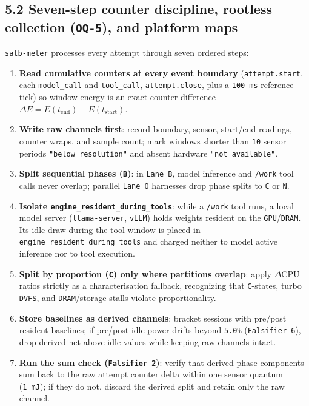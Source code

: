\documentclass[10pt,letterpaper]{article}
\providecommand{\tightlist}{\setlength{\itemsep}{1pt}\setlength{\parskip}{0pt}}
\begin{document}
\subsection{\texorpdfstring{5.2 Seven-step counter discipline, rootless
collection (\texttt{OQ-5}), and platform
maps}{5.2 Seven-step counter discipline, rootless collection (OQ-5), and platform maps}}\label{seven-step-counter-discipline-rootless-collection-oq-5-and-platform-maps}

\texttt{satb-\allowbreak{}meter} processes every attempt through seven ordered steps:

\begin{enumerate}
\def\labelenumi{\arabic{enumi}.}
\tightlist
\item
  \textbf{Read cumulative counters at every event boundary}
  (\texttt{attempt.\allowbreak{}start}, each \texttt{model\_\allowbreak{}call} and
  \texttt{tool\_\allowbreak{}call}, \texttt{attempt.\allowbreak{}close}, plus a \texttt{100\ ms}
  reference tick) so window energy is an exact counter difference
  \(\Delta E = E(t_{\text{end}}) - E(t_{\text{start}})\).
\item
  \textbf{Write raw channels first}: record boundary, sensor, start/end
  readings, counter wraps, and sample count; mark windows shorter than
  \texttt{10} sensor periods \texttt{"below\_\allowbreak{}resolution"} and absent
  hardware \texttt{"not\_\allowbreak{}available"}.
\item
  \textbf{Split sequential phases (\texttt{B})}: in \texttt{Lane\ B},
  model inference and \texttt{/work} tool calls never overlap; parallel
  \texttt{Lane\ O} harnesses drop phase splits to \texttt{C} or
  \texttt{N}.
\item
  \textbf{Isolate \texttt{engine\_\allowbreak{}resident\_\allowbreak{}during\_\allowbreak{}tools}}: while a
  \texttt{/work} tool runs, a local model server (\texttt{llama-\allowbreak{}server},
  \texttt{vLLM}) holds weights resident on the
  \texttt{GPU}/\allowbreak{}\texttt{DRAM}. Its idle draw during the tool window is
  placed in \texttt{engine\_\allowbreak{}resident\_\allowbreak{}during\_\allowbreak{}tools} and charged neither
  to model active inference nor to tool execution.
\item
  \textbf{Split by proportion (\texttt{C}) only where partitions
  overlap}: apply \(\Delta \text{CPU}\) ratios strictly as a
  characterisation fallback, recognizing that \texttt{C}-states, turbo
  \texttt{DVFS}, and \texttt{DRAM}/\allowbreak{}storage stalls violate
  proportionality.
\item
  \textbf{Store baselines as derived channels}: bracket sessions with
  pre/post resident baselines; if pre/post idle power drifts beyond
  \texttt{5.0\%} (\texttt{Falsifier\ 6}), drop derived net-above-idle
  values while keeping raw channels intact.
\item
  \textbf{Run the sum check (\texttt{Falsifier\ 2})}: verify that
  derived phase components sum back to the raw attempt counter delta
  within one sensor quantum (\texttt{1\ mJ}); if they do not, discard
  the derived split and retain only the raw channel.
\end{enumerate}
\end{document}
